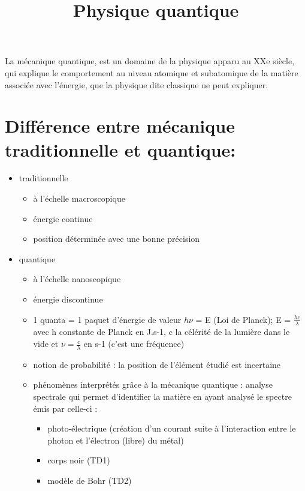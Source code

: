 \documentclass{article}
\author{}
\date{}
\title{Physique quantique}
\begin{document}
\maketitle

La mécanique quantique, est un domaine de la physique apparu au XXe siècle, qui explique le comportement au niveau atomique et subatomique de la matière associée avec l'énergie, que la physique dite classique ne peut expliquer.

\section{Différence entre mécanique traditionnelle et quantique:}
\begin{itemize}
    \item{traditionnelle}
        \begin{itemize}
        \item à l'échelle macroscopique
        \item énergie continue
        \item position déterminée avec une bonne précision
        \end{itemize}
    \item{quantique}
        \begin{itemize}
        \item à l'échelle nanoscopique
        \item énergie discontinue
        \item 1 quanta = 1 paquet d'énergie de valeur $h\nu$ = E (Loi de Planck); E = $\frac{hc}{\lambda}$ avec h constante de Planck en J.s-1, c la célérité de la lumière dans le vide et $\nu = \frac{c}{\lambda}$ en s-1 (c'est une fréquence)
        \item notion de probabilité : la position de l'élément étudié est incertaine
        \item phénomènes interprétés grâce à la mécanique quantique : analyse spectrale qui permet d'identifier la matière en ayant analysé le spectre émis par celle-ci :
            \begin{itemize}
            \item photo-électrique (création d'un courant suite à l'interaction entre le photon et l'électron (libre) du métal)
            \item corps noir (TD1)
            \item modèle de Bohr (TD2)
            \end{itemize}
        \end{itemize}
\end{itemize}
\end{document}
